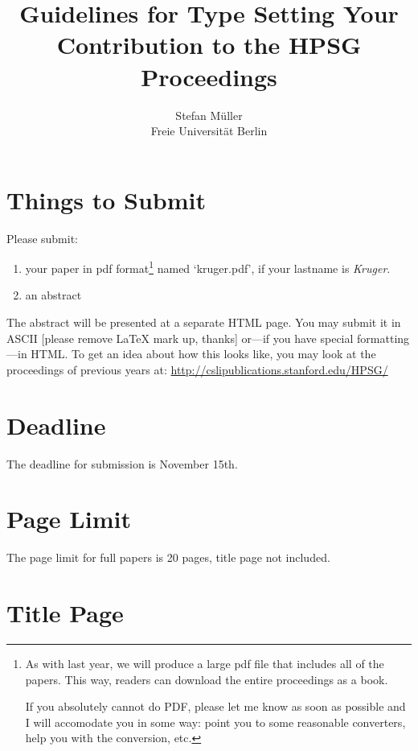 \documentclass[11pt,a4paper,fleqn]{article}
\title{Guidelines for Type Setting Your Contribution to the HPSG Proceedings}
\author{Stefan Müller\\
Freie Universität Berlin}
\begin{document}
\maketitle


\section{Things to Submit}

Please submit:
\begin{enumerate}
\item your paper in pdf format\footnote{
As with last year, we will produce a large pdf file that includes all
of the papers.  This way, readers can download the entire proceedings
as a book.

If you absolutely cannot do PDF, please let me know as soon as
possible and I will accomodate you in some way: point you to some
reasonable converters, help you with the conversion, etc.}
%
 named `kruger.pdf', if your lastname is \emph{Kruger}.



\item an abstract
\end{enumerate}
The abstract will be presented at a separate HTML page. You may submit it in ASCII [please remove \LaTeX{} mark up, thanks]
or---if you have special formatting---in HTML. 
To get an idea about how this looks like,
you may look at the proceedings of previous years at:\newline
\url{http://cslipublications.stanford.edu/HPSG/}

\section{Deadline}

The deadline for submission is November 15th.

\section{Page Limit}

The page limit for full papers is 20 pages, title page not included.


\section{Title Page}
\end{document}
